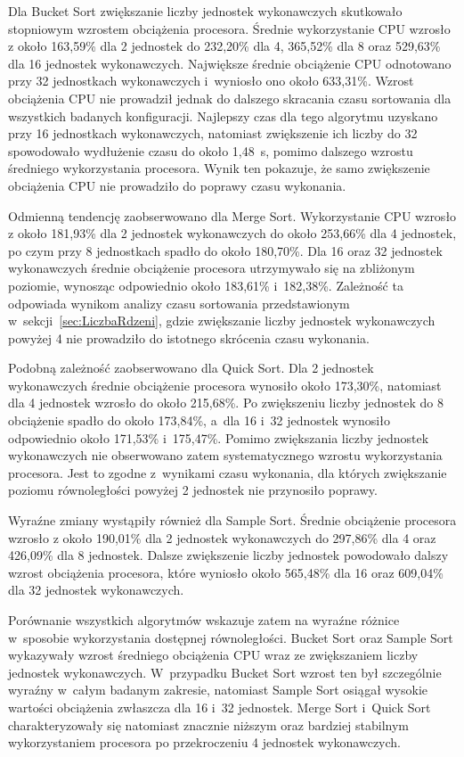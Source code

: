 Dla Bucket Sort zwiększanie liczby jednostek wykonawczych skutkowało stopniowym wzrostem obciążenia procesora. 
Średnie wykorzystanie CPU wzrosło z około 163,59\% dla 2 jednostek do 232,20\% dla 4,
365,52\% dla 8 oraz 529,63\% dla 16 jednostek wykonawczych.
Największe średnie obciążenie CPU odnotowano przy 32 jednostkach wykonawczych i~wyniosło ono około 633,31\%.
Wzrost obciążenia CPU nie prowadził jednak do dalszego skracania czasu sortowania dla wszystkich badanych konfiguracji.
Najlepszy czas dla tego algorytmu uzyskano przy 16 jednostkach wykonawczych, 
natomiast zwiększenie ich liczby do 32 spowodowało wydłużenie czasu do około 1,48~s, pomimo dalszego wzrostu średniego wykorzystania procesora. 
Wynik ten pokazuje, że samo zwiększenie obciążenia CPU nie prowadziło do poprawy czasu wykonania.

Odmienną tendencję zaobserwowano dla Merge Sort. 
Wykorzystanie CPU wzrosło z około 181,93\% dla 2 jednostek wykonawczych do około 253,66\% dla 4 jednostek, 
po czym przy 8 jednostkach spadło do około 180,70\%. 
Dla 16 oraz 32 jednostek wykonawczych średnie obciążenie procesora utrzymywało się na zbliżonym poziomie, 
wynosząc odpowiednio około 183,61\% i~182,38\%.
Zależność ta odpowiada wynikom analizy czasu sortowania przedstawionym w~sekcji~\ref{sec:LiczbaRdzeni}, 
gdzie zwiększanie liczby jednostek wykonawczych powyżej 4 nie prowadziło do istotnego skrócenia czasu wykonania.

Podobną zależność zaobserwowano dla Quick Sort. 
Dla 2 jednostek wykonawczych średnie obciążenie procesora wynosiło około 173,30\%, natomiast dla 4 jednostek wzrosło do około 215,68\%. 
Po zwiększeniu liczby jednostek do 8 obciążenie spadło do około 173,84\%, a~dla 16 i~32 jednostek wynosiło odpowiednio około 171,53\% i~175,47\%.
Pomimo zwiększania liczby jednostek wykonawczych nie obserwowano zatem systematycznego wzrostu wykorzystania procesora. 
Jest to zgodne z~wynikami czasu wykonania, dla których zwiększanie poziomu równoległości powyżej 2 jednostek nie przynosiło poprawy.

Wyraźne zmiany wystąpiły również dla Sample Sort. 
Średnie obciążenie procesora wzrosło z około 190,01\% dla 2 jednostek wykonawczych do 297,86\% dla 4 oraz 426,09\% dla 8 jednostek.
Dalsze zwiększenie liczby jednostek powodowało dalszy wzrost obciążenia procesora, 
które wyniosło około 565,48\% dla 16 oraz 609,04\% dla 32 jednostek wykonawczych.

Porównanie wszystkich algorytmów wskazuje zatem na wyraźne różnice w~sposobie wykorzystania dostępnej równoległości. 
Bucket Sort oraz Sample Sort wykazywały wzrost średniego obciążenia CPU wraz ze zwiększaniem liczby jednostek wykonawczych. 
W~przypadku Bucket Sort wzrost ten był szczególnie wyraźny w~całym badanym zakresie, 
natomiast Sample Sort osiągał wysokie wartości obciążenia zwłaszcza dla 16 i~32 jednostek. 
Merge Sort i~Quick Sort charakteryzowały się natomiast znacznie niższym oraz bardziej stabilnym wykorzystaniem procesora 
po przekroczeniu 4 jednostek wykonawczych.


